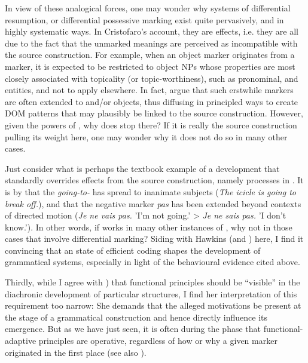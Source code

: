 \documentclass[output=paper]{langsci/langscibook}
\begin{document}
In view of these analogical forces, one may wonder why systems of differential resumption,  or differential possessive marking exist quite pervasively, and in highly systematic ways. In Cristofaro’s account, they are  effects, i.e. they are all due to the fact that the unmarked meanings are perceived as incompatible with the source construction. For example, when an object marker originates from a  marker, it is expected to be restricted to object NPs whose properties are most closely associated with topicality (or topic-worthiness), such as pronominal,  and  entities, and not to apply elsewhere. In fact, \citet{DalrympleNikolaeva2011} argue that such erstwhile  markers are often extended to  and/or  objects, thus diffusing in principled ways to create DOM patterns that may plausibly be linked to the source construction. However, given the powers of , why does  stop there? If it is really the source construction pulling its weight here, one may wonder why it does not do so in many other cases. 

Just consider what is perhaps the textbook example of a development that standardly overrides effects from the source construction, namely  processes in . It is by  that the \textit{going-to-} has spread to inanimate subjects (\textit{The icicle is going to break off.}), and that the  negative marker \textit{pas} has been extended beyond contexts of directed motion (\textit{Je ne vais pas.} 'I'm not going.' > \textit{Je ne sais pas.} 'I don't know.'). In other words, if  works in many other instances of , why not in those cases that involve differential marking? Siding with Hawkins (and ) here, I find it convincing that an  state of efficient coding shapes the development of grammatical systems, especially in light of the behavioural evidence cited above.

Thirdly, while I agree with ) that functional principles should be “visible” in the diachronic development of particular structures, I find her interpretation of this requirement too narrow: She demands that the alleged motivations be present at the  stage of a grammatical construction and hence directly influence its emergence. But as we have just seen, it is often during the  phase that functional-adaptive principles are operative, regardless of how or why a given marker originated in the first place (see also ). 
\end{document}
